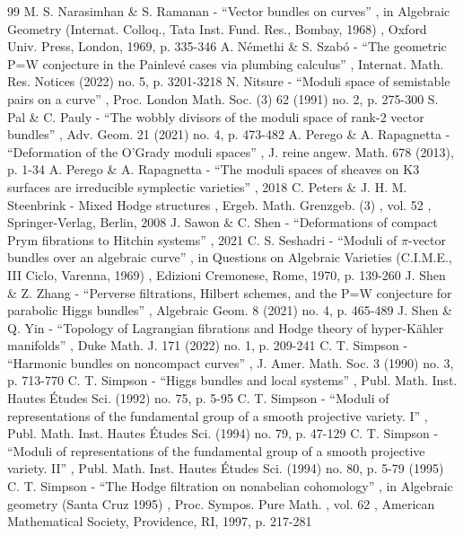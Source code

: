 \documentclass[11pt]{article}
\theoremstyle{definition}
\begin{document}
\begin{thebibliography}{99}
 M. S. Narasimhan \& S. Ramanan - “Vector bundles on curves” , in Algebraic Geometry (Internat. Colloq., Tata Inst. Fund. Res., Bombay, 1968) , Oxford Univ. Press, London, 1969, p. 335-346
 A. Némethi \& S. Szabó - “The geometric P=W conjecture in the Painlevé cases via plumbing calculus” , Internat. Math. Res. Notices (2022) no. 5, p. 3201-3218
 N. Nitsure - “Moduli space of semistable pairs on a curve” , Proc. London Math. Soc. (3) 62 (1991) no. 2, p. 275-300
 S. Pal \& C. Pauly - “The wobbly divisors of the moduli space of rank-2 vector bundles” , Adv. Geom. 21 (2021) no. 4, p. 473-482
 A. Perego \& A. Rapagnetta - “Deformation of the O’Grady moduli spaces” , J. reine angew. Math. 678 (2013), p. 1-34
 A. Perego \& A. Rapagnetta - “The moduli spaces of sheaves on K3 surfaces are irreducible symplectic varieties” , 2018
 C. Peters \& J. H. M. Steenbrink - Mixed Hodge structures , Ergeb. Math. Grenzgeb. (3) , vol. 52 , Springer-Verlag, Berlin, 2008
 J. Sawon \& C. Shen - “Deformations of compact Prym fibrations to Hitchin systems” , 2021
 C. S. Seshadri - “Moduli of $\pi $-vector bundles over an algebraic curve” , in Questions on Algebraic Varieties (C.I.M.E., III Ciclo, Varenna, 1969) , Edizioni Cremonese, Rome, 1970, p. 139-260
 J. Shen \& Z. Zhang - “Perverse filtrations, Hilbert schemes, and the P=W conjecture for parabolic Higgs bundles” , Algebraic Geom. 8 (2021) no. 4, p. 465-489
 J. Shen \& Q. Yin - “Topology of Lagrangian fibrations and Hodge theory of hyper-Kähler manifolds” , Duke Math. J. 171 (2022) no. 1, p. 209-241
 C. T. Simpson - “Harmonic bundles on noncompact curves” , J. Amer. Math. Soc. 3 (1990) no. 3, p. 713-770
 C. T. Simpson - “Higgs bundles and local systems” , Publ. Math. Inst. Hautes Études Sci. (1992) no. 75, p. 5-95
 C. T. Simpson - “Moduli of representations of the fundamental group of a smooth projective variety. I” , Publ. Math. Inst. Hautes Études Sci. (1994) no. 79, p. 47-129
 C. T. Simpson - “Moduli of representations of the fundamental group of a smooth projective variety. II” , Publ. Math. Inst. Hautes Études Sci. (1994) no. 80, p. 5-79 (1995)
 C. T. Simpson - “The Hodge filtration on nonabelian cohomology” , in Algebraic geometry (Santa Cruz 1995) , Proc. Sympos. Pure Math. , vol. 62 , American Mathematical Society, Providence, RI, 1997, p. 217-281

\end{thebibliography}
\end{document}
